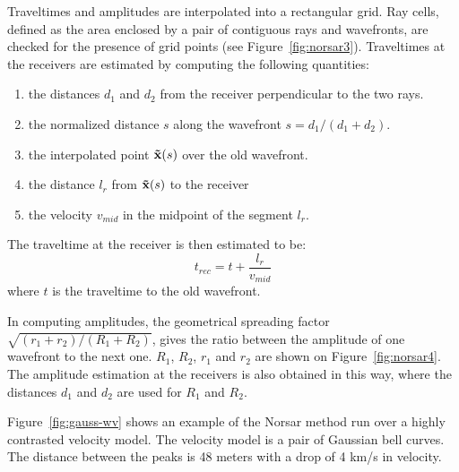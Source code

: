 Traveltimes and amplitudes are interpolated into a rectangular
grid. Ray cells, defined as the area enclosed by a pair of contiguous rays
and wavefronts, are checked for the presence of grid points
(see Figure~\ref{fig:norsar3}). Traveltimes at
the receivers are estimated by computing the following quantities:

\begin{enumerate}
 \item the distances $d_{1}$ and $d_{2}$ from the receiver perpendicular
 to the two rays.
 \item the normalized distance $s$ along the wavefront
 $s = d_{1}/(d_{1}+d_{2})$.
 \item the interpolated point ${\bf \vec{x}}(s)$ over the old wavefront.
 \item the distance $l_{r}$ from ${\bf \vec{x}}(s)$ to the receiver
 \item the velocity $v_{mid}$ in the midpoint of the segment $l_{r}$.
\end{enumerate}

The traveltime at the receiver is then estimated to be:
%
\begin{equation}
 t_{rec} = t + \frac{l_{r}}{v_{mid}}
\label{eqn:tt}
\end{equation}
%
where $t$ is the traveltime to the old wavefront.


In computing amplitudes,
the geometrical spreading factor $\sqrt{(r_{1}+r_{2})/(R_{1}+R_{2})}$,
gives the ratio between the amplitude of one wavefront to the next
one. $R_{1}$, $R_{2}$, $r_{1}$ and $r_{2}$ are shown on
Figure~\ref{fig:norsar4}. The amplitude estimation at
the receivers is also obtained in this way, where the distances
$d_{1}$ and $d_{2}$ are used for $R_{1}$ and $R_{2}$.

Figure~\ref{fig:gauss-wv} shows an example of the Norsar method
run over a highly contrasted velocity model. The velocity model 
is a pair of Gaussian bell curves. The distance between
the peaks is 48 meters with a drop of 4 km/s in velocity.



